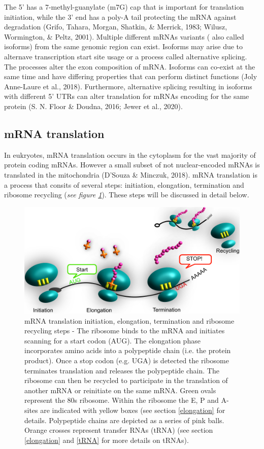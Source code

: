 \documentclass[12pt,openany]{book}
\begin{document}
The 5' has a 7-methyl-guanylate (m7G) cap that is important for
translation initiation, while the 3' end has a poly-A tail protecting
the mRNA against degradation (Grifo, Tahara, Morgan, Shatkin, \&
Merrick, 1983; Wilusz, Wormington, \& Peltz, 2001). Multiple different
mRNAs variants ( also called isoforms) from the same genomic region can
exist. Isoforms may arise due to alternave transcription start site
usage or a process called alternative splicing. The processes alter the
exon composition of mRNA. Isoforms can co-exist at the same time and
have differing properties that can perform distinct functions (Joly
Anne-Laure et al., 2018). Furthermore, alternative splicing resulting in
isoforms with different 5' UTRs can alter translation for mRNAs encoding
for the same protein (S. N. Floor \& Doudna, 2016; Jewer et al., 2020).

\subsection{mRNA translation} \label{translation}

In eukryotes, mRNA translation occurs in the cytoplasm for the vast
majority of protein coding mRNAs. However a small subset of not
nuclear-encoded mRNAs is translated in the mitochondria (D'Souza \&
Minczuk, 2018). mRNA translation is a process that consits of several
steps: initiation, elongation, termination and ribosome recycling
(\emph{see figure \ref{fig:doodlemRNASteps}}). These steps will be
discussed in detail below.

\begin{figure}
  \includegraphics{./figures/doodleTranslation.pdf}
  \caption{mRNA translation initiation, elongation, termination and ribosome recycling steps - The ribosome binds to the mRNA and initiates scanning for a start codon (AUG). The elongation phase incorporates amino acids into a polypeptide chain (i.e. the protein product). Once a stop codon (e.g. UGA) is detected the ribosome terminates translation and releases the polypeptide chain. The ribosome can then be recycled to participate in the translation of another mRNA or reinitiate on the same mRNA. Green ovals represent the 80s ribosome. Within the ribosome the E, P and A-sites are indicated with yellow boxes (see section \ref{elongation} for details. Polypeptide chains are depicted as a series of pink balls. Orange crosses represent transfer RNAs (tRNA) (see section \ref{elongation} and \ref{tRNA} for more details on tRNAs).  \label{fig:doodlemRNASteps}}
\end{figure}
\end{document}
